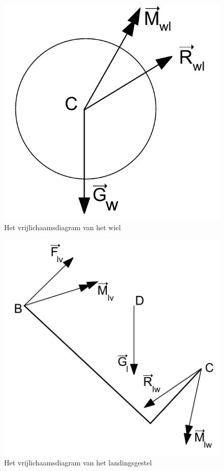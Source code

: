 \begin{figure}[h!]
\centering
\includegraphics[scale=0.5]{Vrijlichaamsdiagram_wiel}
\caption{Het vrijlichaamsdiagram van het wiel}
\end{figure}

\begin{figure}[h!]
\centering
\includegraphics[scale=0.5]{Vrijlichaamsdiagram_landing}
\caption{Het vrijlichaamsdiagram van het landingsgestel}
\end{figure}